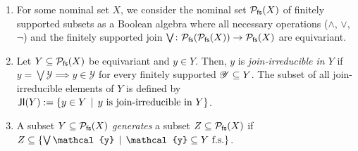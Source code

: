\documentclass[a4paper,UKenglish,cleveref,autoref,thm-restate,numberwithinsect,final]{lipics-v2021}
\begin{document}
      \begin{defn}[{\cite[Defn.~4.3]{ms22}}]
        \begin{enumerate}
          \item For some nominal set $X$, we consider the nominal set $\mathcal{P}_{\mathsf{fs}}(X)$ of finitely supported subsets
            as a Boolean algebra where all necessary operations ($\wedge$, $\vee$, $\neg$) and the finitely supported join $\bigvee\colon \mathcal{P}_{\mathsf{fs}}(\mathcal{P}_{\mathsf{fs}}(X)) \to \mathcal{P}_{\mathsf{fs}}(X)$ are equivariant.
          \item Let $Y \subseteq \mathcal{P}_{\mathsf{fs}}(X)$ be equivariant and $y \in Y$. Then, $y$ is \emph{join-irreducible in $Y$}
            if $y = \bigvee \mathscr{Y} \implies y \in \mathscr{Y}$ for every finitely supported $\mathscr{Y} \subseteq Y$.
            The subset of all join-irreducible elements of $Y$ is defined by $\mathsf{JI}(Y) := \{y \in Y\,\mid\,\text{$y$ is join-irreducible in $Y$}\}$.
          \item A subset $Y \subseteq \mathcal{P}_{\mathsf{fs}}(X)$ \emph{generates} a subset $Z \subseteq \mathcal{P}_{\mathsf{fs}}(X)$ if $Z \seq \setw{\bigvee \mathcal{y}}{\text{$\mathcal{y} \seq Y$ f.s.}}$.
        \end{enumerate}
      \end{defn}
\end{document}
